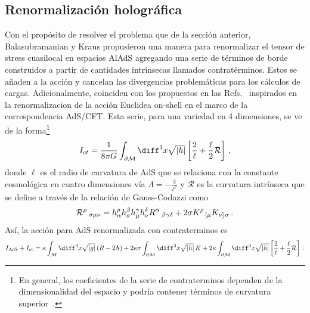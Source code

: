 \documentclass[../Main.tex]{subfiles}
\begin{document}
\subsection{Renormalización holográfica}

Con el propósito de resolver el problema que de la sección anterior, Balasubramanian y Kraus \cite{balasubramanian1999stress} propusieron una manera para renormalizar el tensor de stress cuasilocal en espacios AlAdS agregando una serie de términos de borde construidos a partir de cantidades intrínsecas llamados contratérminos. Estos se añaden a la acción y cancelan las divergencias problemáticas para los cálculos de cargas. Adicionalmente, coinciden con los propuestos en las Refs.~\cite{Emparan:1999pm,deHaro:2000vlm,Skenderis:2002wp} inspirados en la renormalizacion de la acción Euclidea on-shell en el marco de la correspondencia AdS/CFT. Esta serie, para una variedad en 4 dimensiones, se ve de la forma\footnote{En general, los coeficientes de la serie de contraterminos dependen de la dimensionalidad del espacio y podría contener términos de curvatura superior~\cite{Emparan:1999pm,deHaro:2000vlm,Skenderis:2002wp}.}
\begin{equation}
    I_{ct}=\frac{1}{8\pi G}\int_{\partial\mathcal{M}}\diff^{3}x\sqrt{\lvert h\rvert}\left[\frac{2}{\ell}+\frac{\ell}{2}\mathcal{R} \right]  \, ,\label{ct}
\end{equation}
donde $\ell$ es el radio de curvatura de AdS que se relaciona con la constante cosmológica en cuatro dimensiones vía $\Lambda=-\tfrac{3}{\ell^2}$ y $\mathcal{R}$ es la curvatura intrínseca que se define a través de la relación de Gauss-Codazzi como
\begin{equation}
    \mathcal{R}^{\rho}\hspace{0.5ex}_{\sigma\mu\nu}=h^{\rho}_{\alpha}h^{\beta}_{\sigma}h^{\gamma}_{\mu}h^{\delta}_{\nu}R^{\alpha}\hspace{0.5ex}_{\beta\gamma\delta}+2\sigma K^{\rho}\hspace{0.3ex}_{[\mu}K_{\nu]\hspace{0.3ex}
    \sigma} \,.
\end{equation}
Así, la acción para AdS renormalizada con contraterminos es
\begin{align}
    I_{\rm AdS}+I_{\rm ct}=\kappa \int_{\mathcal{M}} \diff^{4}x \sqrt{\lvert g\rvert}\, (R-2\Lambda) + 2 \kappa\sigma\int_{\partial\mathcal{M}} \diff^{3}x \sqrt{\lvert h\rvert}\, K+2 \kappa\int_{\partial\mathcal{M}}\diff^{3}x\sqrt{\lvert h\rvert}\left[\frac{2}{\ell}+\frac{\ell}{2}\mathcal{R} \right]\, . 
\end{align}
\end{document}
